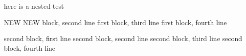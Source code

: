 here is a nested test
\begin{one}
		NEW NEW block, second line
		first block, third line
		first block, fourth line
	\begin{two}
		second block, first line
		second block, second line
		second block, third line
		second block, fourth line
	\end{two}
\end{one}
